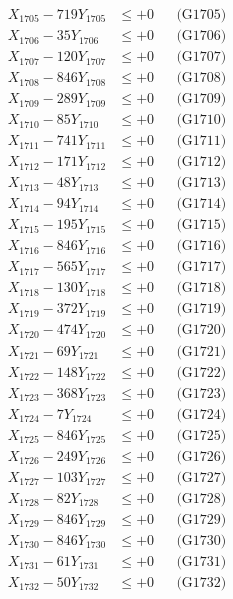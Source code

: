 \documentclass[a4paper,10pt]{article}
\begin{document}
{\begin{align}
X_{1705} - 719Y_{1705} &\leq +0 && \text{(G1705)} \\
X_{1706} - 35Y_{1706} &\leq +0 && \text{(G1706)} \\
X_{1707} - 120Y_{1707} &\leq +0 && \text{(G1707)} \\
X_{1708} - 846Y_{1708} &\leq +0 && \text{(G1708)} \\
X_{1709} - 289Y_{1709} &\leq +0 && \text{(G1709)} \\
X_{1710} - 85Y_{1710} &\leq +0 && \text{(G1710)} \\
\allowbreak
X_{1711} - 741Y_{1711} &\leq +0 && \text{(G1711)} \\
X_{1712} - 171Y_{1712} &\leq +0 && \text{(G1712)} \\
X_{1713} - 48Y_{1713} &\leq +0 && \text{(G1713)} \\
X_{1714} - 94Y_{1714} &\leq +0 && \text{(G1714)} \\
X_{1715} - 195Y_{1715} &\leq +0 && \text{(G1715)} \\
X_{1716} - 846Y_{1716} &\leq +0 && \text{(G1716)} \\
X_{1717} - 565Y_{1717} &\leq +0 && \text{(G1717)} \\
X_{1718} - 130Y_{1718} &\leq +0 && \text{(G1718)} \\
X_{1719} - 372Y_{1719} &\leq +0 && \text{(G1719)} \\
X_{1720} - 474Y_{1720} &\leq +0 && \text{(G1720)} \\
\allowbreak
X_{1721} - 69Y_{1721} &\leq +0 && \text{(G1721)} \\
X_{1722} - 148Y_{1722} &\leq +0 && \text{(G1722)} \\
X_{1723} - 368Y_{1723} &\leq +0 && \text{(G1723)} \\
X_{1724} - 7Y_{1724} &\leq +0 && \text{(G1724)} \\
X_{1725} - 846Y_{1725} &\leq +0 && \text{(G1725)} \\
X_{1726} - 249Y_{1726} &\leq +0 && \text{(G1726)} \\
X_{1727} - 103Y_{1727} &\leq +0 && \text{(G1727)} \\
X_{1728} - 82Y_{1728} &\leq +0 && \text{(G1728)} \\
X_{1729} - 846Y_{1729} &\leq +0 && \text{(G1729)} \\
X_{1730} - 846Y_{1730} &\leq +0 && \text{(G1730)} \\
\allowbreak
X_{1731} - 61Y_{1731} &\leq +0 && \text{(G1731)} \\
X_{1732} - 50Y_{1732} &\leq +0 && \text{(G1732)} \\

\end{align}}
\end{document}
